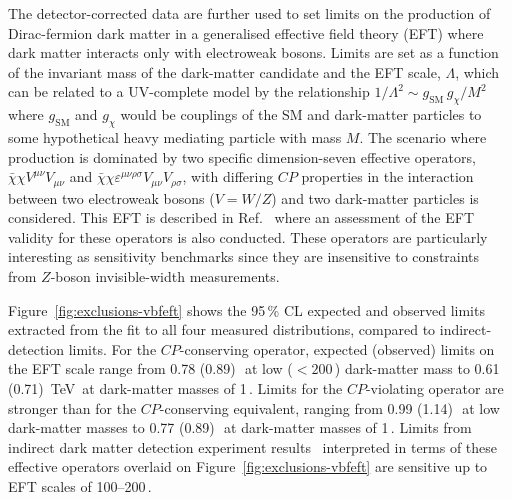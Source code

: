 \documentclass[cernpreprint,txfonts,UKenglish,texlive=2016]{\ATLASLATEXPATH atlasdoc}
\begin{document}
The detector-corrected data are further used to set limits on the production of Dirac-fermion dark matter 
in a generalised effective field theory (EFT) where dark matter interacts only with electroweak bosons.
Limits are set as a function of the invariant mass of the dark-matter candidate and the EFT scale, $\Lambda$, 
which can be related to a UV-complete model by the relationship
$1/\Lambda^2 \sim g_\mathrm{SM}\, g_\chi /M^2$ where $g_\mathrm{SM}$ and $g_\chi$ would be couplings 
of the SM and dark-matter particles to some hypothetical heavy mediating particle with mass $M$.
The scenario where production is dominated by two specific dimension-seven effective operators, 
$\bar{\chi}\chi V^{\mu\nu}V_{\mu\nu}$ and $\bar{\chi}\chi \varepsilon^{\mu\nu\rho\sigma} V_{\mu\nu}V_{\rho\sigma}$,
with differing $CP$ properties in the interaction between two
electroweak bosons ($V=W/Z$) and two dark-matter particles is considered. 
This EFT is described in Ref.~\cite{Cotta:2012nj} where an assessment of the EFT validity 
for these operators is also conducted. These operators are particularly interesting as sensitivity 
benchmarks since they are insensitive to constraints from $Z$-boson invisible-width measurements.

Figure~\ref{fig:exclusions-vbfeft} shows the 95\,\% CL expected and observed limits extracted from the 
fit to all four measured distributions, compared to indirect-detection limits. 
For the $CP$-conserving operator, expected (observed) limits on the EFT scale
range from 0.78 (0.89)\,\TeV\ at low ($<200$\,\GeV) dark-matter mass to 0.61 (0.71)~TeV\ at dark-matter masses of 1\,\TeV. 
Limits for the $CP$-violating operator are stronger than for the $CP$-conserving equivalent, 
ranging from 0.99 (1.14)\,\TeV\ at low dark-matter masses to 0.77 (0.89)\,\TeV\ at dark-matter masses of 1\,\TeV.
Limits from indirect dark matter detection experiment results~\cite{Ackermann:2011wa,Aliu:2012ga,Cotta:2012nj} 
interpreted in terms of these effective operators overlaid on Figure~\ref{fig:exclusions-vbfeft} are sensitive up to EFT scales of 100--200\,\GeV.
\end{document}
